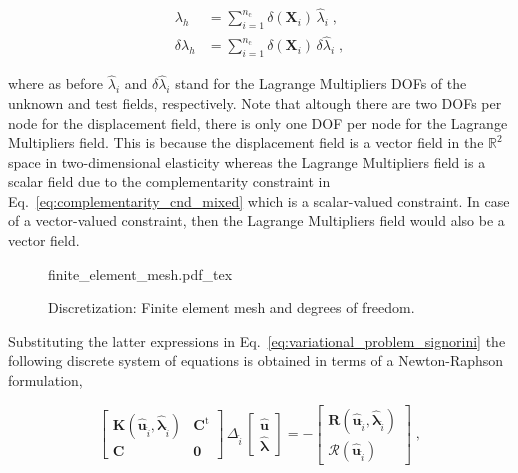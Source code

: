 \documentclass[10pt,a4paper]{article}
\begin{document}
\begin{subequations}
	\begin{alignat}{1}
		\lambda_h &= \sum_{i = 1}^{n_{\text{c}}} \delta(\mathbf{X}_i) \, \hat{\lambda}_i \;, \label{eq:discretization_lambda} \\
		\delta \lambda_h &= \sum_{i = 1}^{n_{\text{c}}} \delta(\mathbf{X}_i) \, \delta\hat{\lambda}_i \;, \label{eq:discretization_lambda_u}
	\end{alignat}
\end{subequations}

where as before $\hat{\lambda}_i$ and $\delta\hat{\lambda}_i$ stand for the Lagrange Multipliers DOFs of the unknown and test fields, respectively. Note that altough there are two DOFs per node for the displacement field, there is only one DOF per node for the Lagrange Multipliers field. This is because the displacement field is a vector field in the $\mathbb{R}^2$ space in two-dimensional elasticity whereas the Lagrange Multipliers field is a scalar field due to the complementarity constraint in Eq.~\eqref{eq:complementarity_cnd_mixed} which is a scalar-valued constraint. In case of a vector-valued constraint, then the Lagrange Multipliers field would also be a vector field.\\

\begin{figure}[!t]
	\centering
	\footnotesize
    \def\svgwidth{0.7\textwidth}{finite_element_mesh.pdf_tex}
	\caption{Discretization: Finite element mesh and degrees of freedom.}
	\label{im:finite_element_mesh}
\end{figure}

Substituting the latter expressions in Eq.~\eqref{eq:variational_problem_signorini} the following discrete system of equations is obtained in terms of a Newton-Raphson formulation,

\begin{equation}
	\left[ \begin{array}{cc}
		\mathbf{K} ( \hat{\mathbf{u}}_{\hat{i}} , \hat{\boldsymbol{\lambda}}_{\hat{i}} ) & \mathbf{C}^{\text{t}} \\
		\mathbf{C} & \mathbf{0}
\end{array}	 \right] \, \Delta_{\hat{i}} \, \left[ \begin{array}{c}
	\hat{\mathbf{u}} \\
	\hat{\boldsymbol{\lambda}}
\end{array} \right] = - \left[ \begin{array}{c}
	\mathbf{R} ( \hat{\mathbf{u}}_{\hat{i}} , \hat{\boldsymbol{\lambda}}_{\hat{i}} ) \\
	\boldsymbol{\mathcal{R}} ( \hat{\mathbf{u}}_{\hat{i}} )
\end{array} \right] \;, \label{eq:system_discrete_form_lagrange_multipliers}
\end{equation}
\end{document}
